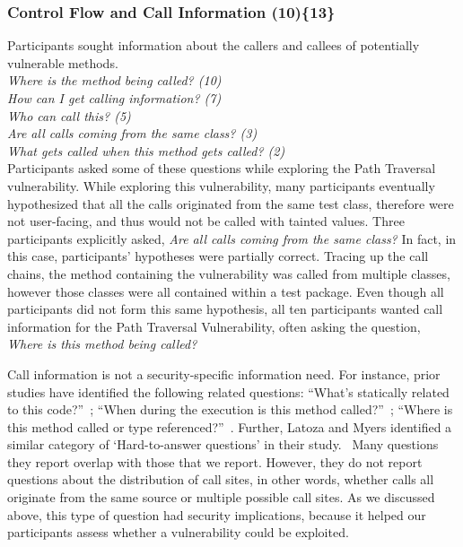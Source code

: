 \documentclass[10pt,journal,compsoc]{IEEEtran}
\begin{document}

\subsubsection{Control Flow and Call Information (10)\{13\}}\label{cf}

Participants sought information about the callers and callees of potentially vulnerable methods.
\\

\noindent\emph{Where is the method being called? (10)} \\
\emph{How can I get calling information? (7)} \\
\emph{Who can call this? (5)} \\
\emph{Are all calls coming from the same class? (3)} \\
\emph{What gets called when this method gets called? (2)}
\\

Participants asked some of these questions while exploring the Path Traversal vulnerability.
While exploring this vulnerability, many participants eventually hypothesized that all the calls originated from the same test class, therefore were not user-facing, and thus would not be called with tainted values.
Three participants explicitly asked, \textit{Are all calls coming from the same class?} 
In fact, in this case, participants' hypotheses were partially correct. 
Tracing up the call chains, the method containing the vulnerability was called from multiple classes, however those classes were all contained within a test package.
Even though all participants did not form this same hypothesis, all ten participants wanted call information for the Path Traversal Vulnerability, often asking the question, \textit{Where is this method being called?} 


Call information is not a security-specific information need. 
For instance, prior studies have identified the following related questions:
``What's statically related to this code?''~\cite{Ko:2007:information};
``When during the execution is this method called?''~\cite{sillito2008asking};
``Where is this method called or type referenced?''~\cite{sillito2008asking}.
Further, Latoza and Myers identified a similar category of `Hard-to-answer questions' in their study.~\cite{latoza2010hard} 
Many questions they report overlap with those that we report. 
However, they do not report questions about the distribution of call sites, in other words, whether calls all originate from the same source or multiple possible call sites. 
As we discussed above, this type of question had security implications, because it helped our participants assess whether a vulnerability could be exploited.
\end{document}
